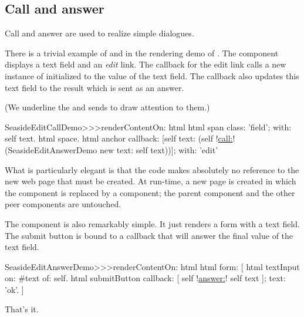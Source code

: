 \documentclass[a4paper,10pt,twoside]{book}
\begin{document}
\subsection{Call and answer}

Call and answer are used to realize simple dialogues.

There is a trivial example of  and  in the rendering demo of
.
The component  displays a text field and an \emph{edit} link.
The callback for the edit link calls a new instance of 
initialized to the value of the text field.
The callback also updates this text field to the result which is sent as an answer.

(We underline the  and  sends to draw attention to them.)

\begin{code}{}
SeasideEditCallDemo>>>renderContentOn: html 
	html span
		class: 'field';
		with: self text.
	html space.
	html anchor
callback: [self text: (self !\underline{call:}! (SeasideEditAnswerDemo new text: self
text))];
		with: 'edit'
\end{code}{}

What is particularly elegant is that the code makes absolutely no reference to the new
web page that must be created.
At run-time, a new page is created in which the  component is
replaced by a  component; the parent component and the other
peer components are untouched.


The  component is also remarkably simple.
It just renders a form with a text field.
The submit button is bound to a callback that will answer the final value of the text
field.

\begin{code}{}
SeasideEditAnswerDemo>>>renderContentOn: html
	html form: [
		html textInput
			on: #text of: self.
		html submitButton
			callback: [ self !\underline{answer:}! self text ];
			text: 'ok'.
		]
\end{code}{}

That's it.
\end{document}
